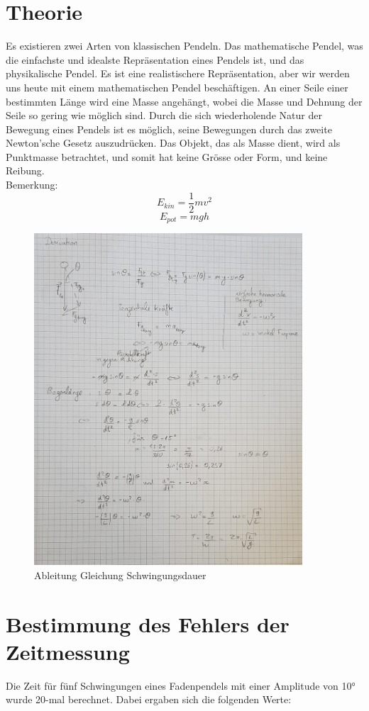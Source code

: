 \documentclass[12pt, a4paper, twoside]{article}
\begin{document}
    \section{Theorie}
    Es existieren zwei Arten von klassischen Pendeln. Das mathematische Pendel, was die einfachste und idealste Repräsentation eines Pendels ist, und das physikalische Pendel. Es ist eine realistischere  Repräsentation, aber wir werden uns heute mit einem mathematischen Pendel beschäftigen. An einer Seile einer bestimmten Länge wird eine Masse angehängt, wobei die Masse und Dehnung der Seile so gering wie möglich sind. 
    Durch die sich wiederholende Natur der Bewegung eines Pendels ist es möglich, seine Bewegungen durch das zweite Newton’sche Gesetz auszudrücken. 
    Das Objekt, das als Masse dient, wird als Punktmasse betrachtet, und somit hat keine Grösse oder Form, und keine Reibung.\\
    Bemerkung:\\
    \[E_{kin}=\frac{1}{2}mv^{2}\] 
    \[E_{pot}=mgh\]
    \begin{figure}[h!]
        \begin{center}
            \includegraphics[scale=0.25, width=10cm]{Theorie.jpeg}
            \caption{Ableitung Gleichung Schwingungsdauer}
        \end{center}
    \end{figure}
    \newpage
    \section{Bestimmung des Fehlers der Zeitmessung}
    Die Zeit für fünf Schwingungen eines Fadenpendels mit einer Amplitude von 10° wurde 20-mal berechnet. Dabei ergaben sich die folgenden Werte:
    \\
    
\end{document}

